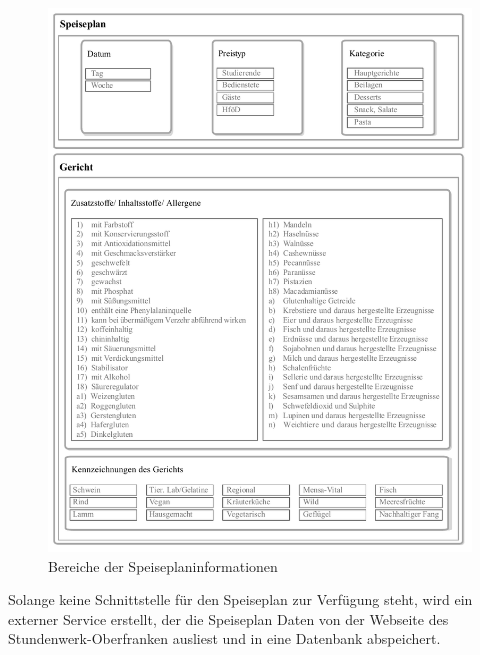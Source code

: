 \begin{figure}[H]
\centering
\includegraphics[width=\pictureWidth cm + 2 cm]{Bilder/Sonstiges/Speiseplan_Kategorisierung.pdf}
\caption{Bereiche der Speiseplaninformationen\label{fig:analysemensa}\protect\footnotemark}
\end{figure}




Solange keine Schnittstelle für den Speiseplan zur Verfügung steht, wird ein externer Service erstellt, der die Speiseplan Daten von der Webseite des Stundenwerk-Oberfranken ausliest und in eine Datenbank abspeichert.

